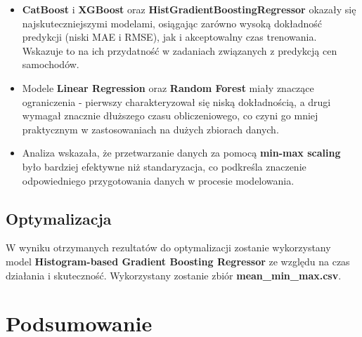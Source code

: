 \documentclass[10pt,letterpaper]{article}
\begin{document}
\begin{itemize}
\item \textbf{CatBoost} i \textbf{XGBoost} oraz \textbf{ HistGradientBoostingRegressor} okazały się najskuteczniejszymi modelami, osiągając zarówno wysoką dokładność predykcji (niski MAE i RMSE), jak i akceptowalny czas trenowania. Wskazuje to na ich przydatność w zadaniach związanych z predykcją cen samochodów.
\item Modele \textbf{Linear Regression} oraz \textbf{Random Forest} miały znaczące ograniczenia - pierwszy charakteryzował się niską dokładnością, a drugi wymagał znacznie dłuższego czasu obliczeniowego, co czyni go mniej praktycznym w zastosowaniach na dużych zbiorach danych.
\item Analiza wskazała, że przetwarzanie danych za pomocą \textbf{min-max scaling} było bardziej efektywne niż standaryzacja, co podkreśla znaczenie odpowiedniego przygotowania danych w procesie modelowania.
\end{itemize}

\newpage
\subsection{Optymalizacja}
W wyniku otrzymanych rezultatów do optymalizacji zostanie wykorzystany model \textbf{Histogram-based Gradient Boosting Regressor} ze względu na czas działania i skuteczność. Wykorzystany zostanie zbiór \textbf{mean\_min\_max.csv}.

\section{Podsumowanie}


 
\end{document}
